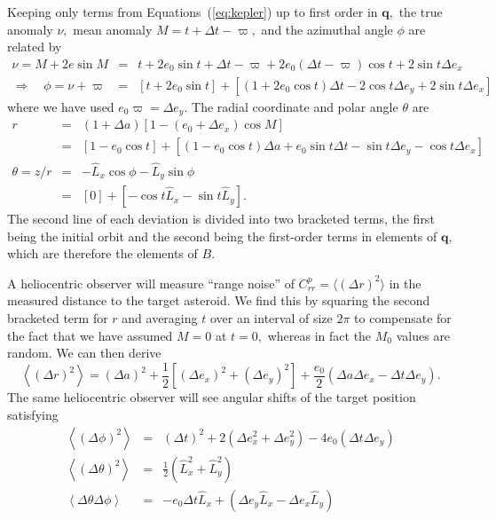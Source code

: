 \documentclass[linenumbers, onecolumn]{aastex631}
\newcommand{\vecq}{\mathbf{q}}
\newcommand{\matB}{B}
\newcommand{\covm}{C}
\newcommand{\lop}{\varpi}
\newcommand{\Lhat}{\hat L}
\begin{document}
Keeping only terms from Equations~(\ref{eq:kepler}) up to first order in $\vecq,$ the true anomaly $\nu,$ mean anomaly $M=t + \Delta t - \lop,$ and the azimuthal angle $\phi$ are related by
\begin{eqnarray}
  \nu  =  M + 2e\sin M  & = & t +  2e_0 \sin t  + \Delta t - \lop + 2 e_0(\Delta t - \lop) \cos t + 2\sin t \Delta e_x \\
  \Rightarrow \quad \phi  =  \nu + \lop & = &  \left[t + 2e_0\sin t\right] + \left[(1+2e_0\cos t) \Delta t - 2\cos t \Delta e_y + 2\sin t \Delta e_x\right]
                                                    \label{eq:phi}
\end{eqnarray}
where we have used $e_0\lop = \Delta e_y.$ The radial coordinate and polar angle $\theta$ are
\begin{eqnarray}
  r & = & (1 + \Delta a) \left[1- (e_0+\Delta e_x) \cos M \right] \nonumber \\
\label{eq:r}
  & = & \left[ 1-e_0\cos t \right] + \left[ (1-e_0\cos t) \Delta a + e_0\sin t \Delta t - \sin t \Delta e_y - \cos t \Delta e_x \right] \\
  \theta = z/r & = & -\Lhat_x \cos\phi - \Lhat_y \sin\phi \nonumber \\
\label{eq:theta}
               & = & \left[ 0 \right] + \left[ -\cos t \Lhat_x  - \sin t \Lhat_y\right].
\end{eqnarray}
The second line of each deviation is divided into two bracketed terms, the first being the initial orbit and the second being the first-order terms in elements of $\vecq,$ which are therefore the elements of $\matB$.

A heliocentric observer will measure ``range noise'' of $\covm^p_{rr}=\langle (\Delta r)^2\rangle$ in the measured distance to the target asteroid.  We find this by squaring the second bracketed term for $r$ and averaging $t$ over an interval of size $2\pi$ to compensate for the fact that we have assumed $M=0$ at $t=0,$ whereas in fact the $M_0$ values are random.  We can then derive
\begin{equation}
  \left\langle(\Delta r)^2\right\rangle = (\Delta a)^2 + \frac{1}{2}\left[ (\Delta e_x)^2 + (\Delta e_y)^2\right] + \frac{e_0}{2}(\Delta a \Delta e_x -  \Delta t \Delta e_y).
  \label{eq:varr}
\end{equation}
The same heliocentric observer will see angular shifts of the target position satisfying
\begin{eqnarray}
  \label{eq:phiphi}
  \left\langle (\Delta\phi)^2\right\rangle & = & (\Delta t)^2 + 2(\Delta e_x^2 + \Delta e_y^2)  -4e_0
  \left(\Delta t \Delta e_y\right)\\
  \label{eq:thetatheta}
  \left\langle (\Delta\theta)^2\right\rangle & = & \frac{1}{2} \left( \Lhat_x^2 + \Lhat_y^2\right) \\
  \label{eq:thetaphi}
  \left\langle \Delta\theta\Delta\phi\right\rangle & = & -e_0\Delta t \Lhat_x + (\Delta e_y \Lhat_x -  \Delta e_x \Lhat_y)
\end{eqnarray}
\end{document}
